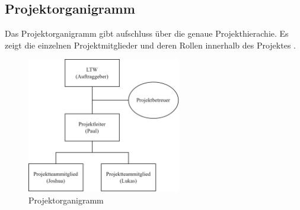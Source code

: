\subsection{Projektorganigramm}

Das Projektorganigramm gibt aufschluss über die genaue Projekthierachie. Es zeigt die einzelnen Projektmitglieder und deren Rollen innerhalb des Projektes .

\begin{figure}[H]
  \centering
  \includegraphics[width=0.6\textwidth]{images/projektorganigramm.png}
  \caption{Projektorganigramm}
  \label{fig:projektorganigramm}
\end{figure}
